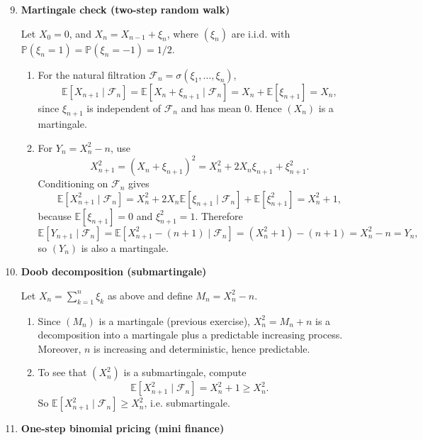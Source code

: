 \documentclass[11pt]{article}
\begin{document}
\begin{enumerate}
\setcounter{enumi}{8}

\item \textbf{Martingale check (two-step random walk)}

Let $X_0=0$, and $X_n=X_{n-1}+\xi_n$, where $(\xi_n)$ are i.i.d. with
$\mathbb{P}(\xi_n=1)=\mathbb{P}(\xi_n=-1)=1/2$.

\begin{enumerate}
\item For the natural filtration $\mathcal{F}_n=\sigma(\xi_1,\dots,\xi_n)$,
\[
\mathbb{E}[X_{n+1}\mid \mathcal{F}_n]=\mathbb{E}[X_n+\xi_{n+1}\mid \mathcal{F}_n]
= X_n + \mathbb{E}[\xi_{n+1}]=X_n,
\]
since $\xi_{n+1}$ is independent of $\mathcal{F}_n$ and has mean $0$. Hence $(X_n)$ is a martingale.

\item For $Y_n=X_n^2-n$, use
\[
X_{n+1}^2=(X_n+\xi_{n+1})^2=X_n^2+2X_n\xi_{n+1}+\xi_{n+1}^2.
\]
Conditioning on $\mathcal{F}_n$ gives
\[
\mathbb{E}[X_{n+1}^2\mid\mathcal{F}_n]=X_n^2+2X_n\mathbb{E}[\xi_{n+1}\mid\mathcal{F}_n]+\mathbb{E}[\xi_{n+1}^2]
=X_n^2+1,
\]
because $\mathbb{E}[\xi_{n+1}]=0$ and $\xi_{n+1}^2=1$. Therefore
\[
\mathbb{E}[Y_{n+1}\mid\mathcal{F}_n]
=\mathbb{E}[X_{n+1}^2-(n+1)\mid\mathcal{F}_n]
=(X_n^2+1)-(n+1)=X_n^2-n=Y_n,
\]
so $(Y_n)$ is also a martingale.
\end{enumerate}

\bigskip

\item \textbf{Doob decomposition (submartingale)}

Let $X_n=\sum_{k=1}^n \xi_k$ as above and define $M_n=X_n^2-n$.

\begin{enumerate}
\item Since $(M_n)$ is a martingale (previous exercise), $X_n^2 = M_n + n$ is a decomposition into a martingale plus a predictable increasing process. Moreover, $n$ is increasing and deterministic, hence predictable.

\item To see that $(X_n^2)$ is a submartingale, compute
\[
\mathbb{E}[X_{n+1}^2\mid \mathcal{F}_n]=X_n^2+1 \ge X_n^2.
\]
So $\mathbb{E}[X_{n+1}^2\mid\mathcal{F}_n]\ge X_n^2$, i.e. submartingale.
\end{enumerate}

\bigskip

\item \textbf{One-step binomial pricing (mini finance)}


\end{enumerate}
\end{document}
